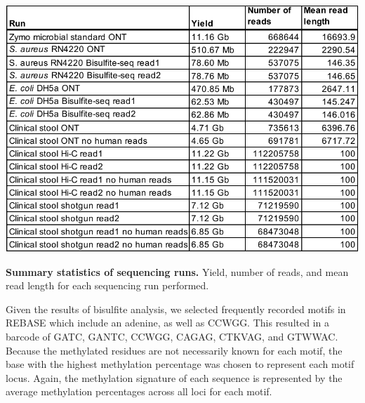 \begin{table}[!hb]
\centering
\includegraphics[width = 1\linewidth,keepaspectratio]{figure/yields.pdf}
\caption[ Summary statistics of sequencing runs]{{\bf  Summary statistics of sequencing runs.} Yield, number of reads, and mean read length for each sequencing run performed. }
\label{tab:yields}
\end{table}


Given the results of bisulfite analysis, we selected frequently recorded motifs in REBASE which include an adenine, as well as CCWGG. This resulted in a barcode of GATC, GANTC, CCWGG, CAGAG, CTKVAG, and GTWWAC. Because the methylated residues are not necessarily known for each motif, the base with the highest methylation percentage was chosen to represent each motif  locus. Again, the methylation signature of each sequence is represented by the average methylation percentages across all loci for each motif.

